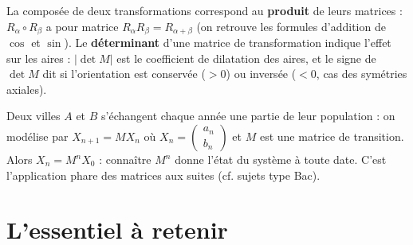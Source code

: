 \begin{remarque}
La composée de deux transformations correspond au \textbf{produit} de leurs matrices :
$R_\alpha\circ R_\beta$ a pour matrice $R_\alpha R_\beta=R_{\alpha+\beta}$ (on retrouve les
formules d'addition de $\cos$ et $\sin$). Le \textbf{déterminant} d'une matrice de transformation
indique l'effet sur les aires : $|\det M|$ est le coefficient de dilatation des aires, et le signe
de $\det M$ dit si l'orientation est conservée ($>0$) ou inversée ($<0$, cas des symétries axiales).
\end{remarque}

\begin{exemple}
Deux villes $A$ et $B$ s'échangent chaque année une partie de leur population : on modélise par
$X_{n+1}=MX_n$ où $X_n=\begin{pmatrix}a_n\\b_n\end{pmatrix}$ et $M$ est une matrice de transition.
Alors $X_n=M^nX_0$ : connaître $M^n$ donne l'état du système à toute date. C'est l'application
phare des matrices aux suites (cf. sujets type Bac).
\end{exemple}

\section{L'essentiel à retenir}

